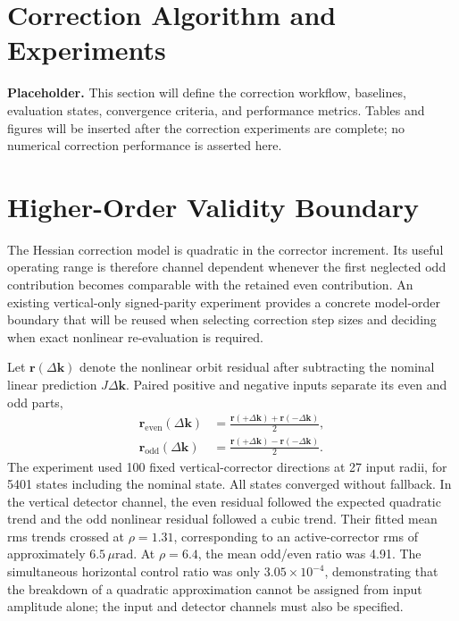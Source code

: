 \documentclass[letterpaper]{jacow}
\begin{document}
\section{Correction Algorithm and Experiments}

\textbf{Placeholder.} This section will define the correction workflow,
baselines, evaluation states, convergence criteria, and performance metrics.
Tables and figures will be inserted after the correction experiments are
complete; no numerical correction performance is asserted here.

\section{Higher-Order Validity Boundary}

The Hessian correction model is quadratic in the corrector increment.  Its
useful operating range is therefore channel dependent whenever the first
neglected odd contribution becomes comparable with the retained even
contribution.  An existing vertical-only signed-parity experiment provides a
concrete model-order boundary that will be reused when selecting correction
step sizes and deciding when exact nonlinear re-evaluation is required.

Let $\bm r(\Delta\bm k)$ denote the nonlinear orbit residual after subtracting
the nominal linear prediction $J\Delta\bm k$.  Paired positive and negative
inputs separate its even and odd parts,
\begin{equation}
  \begin{aligned}
    \bm r_{\mathrm{even}}(\Delta\bm k)
    &=\frac{\bm r(+\Delta\bm k)+\bm r(-\Delta\bm k)}{2},\\
    \bm r_{\mathrm{odd}}(\Delta\bm k)
    &=\frac{\bm r(+\Delta\bm k)-\bm r(-\Delta\bm k)}{2}.
  \end{aligned}
  \label{eq:parity-decomposition}
\end{equation}
The experiment used 100 fixed vertical-corrector directions at 27 input radii,
for 5401 states including the nominal state.  All states converged without
fallback.  In the vertical detector channel, the even residual followed the
expected quadratic trend and the odd nonlinear residual followed a cubic
trend.  Their fitted mean rms trends crossed at $\rho=1.31$, corresponding to
an active-corrector rms of approximately $6.5\,\mu\mathrm{rad}$.  At
$\rho=6.4$, the mean odd/even ratio was 4.91.  The simultaneous horizontal
control ratio was only $3.05\times10^{-4}$, demonstrating that the breakdown
of a quadratic approximation cannot be assigned from input amplitude alone;
the input and detector channels must also be specified.
\end{document}
